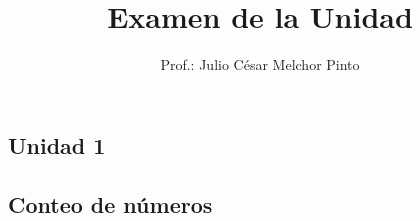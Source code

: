\documentclass[12pt,addpoints]{evalua}
\title{Examen de la Unidad}
\author{Prof.: Julio César Melchor Pinto}
\begin{document}
\tableofcontents
\newpage
\begin{questions}\large
	\section*{Unidad 1}

	\subsection*{Conteo de números}



\end{questions}
\end{document}
